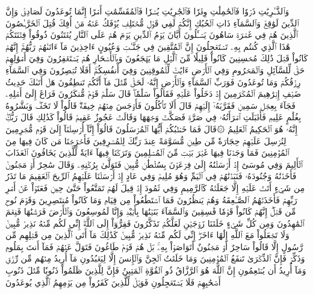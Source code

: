 وَٱلذَّـٰرِيَٰتِ ذَرۡوٗا
فَٱلۡحَٰمِلَٰتِ وِقۡرٗا
فَٱلۡجَٰرِيَٰتِ يُسۡرٗا
فَٱلۡمُقَسِّمَٰتِ أَمۡرًا
إِنَّمَا تُوعَدُونَ لَصَادِقٞ
وَإِنَّ ٱلدِّينَ لَوَٰقِعٞ
وَٱلسَّمَآءِ ذَاتِ ٱلۡحُبُكِ
إِنَّكُمۡ لَفِي قَوۡلٖ مُّخۡتَلِفٖ
يُؤۡفَكُ عَنۡهُ مَنۡ أُفِكَ
قُتِلَ ٱلۡخَرَّـٰصُونَ
ٱلَّذِينَ هُمۡ فِي غَمۡرَةٖ سَاهُونَ
يَسۡـَٔلُونَ أَيَّانَ يَوۡمُ ٱلدِّينِ
يَوۡمَ هُمۡ عَلَى ٱلنَّارِ يُفۡتَنُونَ
ذُوقُواْ فِتۡنَتَكُمۡ هَٰذَا ٱلَّذِي كُنتُم بِهِۦ تَسۡتَعۡجِلُونَ
إِنَّ ٱلۡمُتَّقِينَ فِي جَنَّـٰتٖ وَعُيُونٍ
ءَاخِذِينَ مَآ ءَاتَىٰهُمۡ رَبُّهُمۡۚ إِنَّهُمۡ كَانُواْ قَبۡلَ ذَٰلِكَ مُحۡسِنِينَ
كَانُواْ قَلِيلٗا مِّنَ ٱلَّيۡلِ مَا يَهۡجَعُونَ
وَبِٱلۡأَسۡحَارِ هُمۡ يَسۡتَغۡفِرُونَ
وَفِيٓ أَمۡوَٰلِهِمۡ حَقّٞ لِّلسَّآئِلِ وَٱلۡمَحۡرُومِ
وَفِي ٱلۡأَرۡضِ ءَايَٰتٞ لِّلۡمُوقِنِينَ
وَفِيٓ أَنفُسِكُمۡۚ أَفَلَا تُبۡصِرُونَ
وَفِي ٱلسَّمَآءِ رِزۡقُكُمۡ وَمَا تُوعَدُونَ
فَوَرَبِّ ٱلسَّمَآءِ وَٱلۡأَرۡضِ إِنَّهُۥ لَحَقّٞ مِّثۡلَ مَآ أَنَّكُمۡ تَنطِقُونَ
هَلۡ أَتَىٰكَ حَدِيثُ ضَيۡفِ إِبۡرَٰهِيمَ ٱلۡمُكۡرَمِينَ
إِذۡ دَخَلُواْ عَلَيۡهِ فَقَالُواْ سَلَٰمٗاۖ قَالَ سَلَٰمٞ قَوۡمٞ مُّنكَرُونَ
فَرَاغَ إِلَىٰٓ أَهۡلِهِۦ فَجَآءَ بِعِجۡلٖ سَمِينٖ
فَقَرَّبَهُۥٓ إِلَيۡهِمۡ قَالَ أَلَا تَأۡكُلُونَ
فَأَوۡجَسَ مِنۡهُمۡ خِيفَةٗۖ قَالُواْ لَا تَخَفۡۖ وَبَشَّرُوهُ بِغُلَٰمٍ عَلِيمٖ
فَأَقۡبَلَتِ ٱمۡرَأَتُهُۥ فِي صَرَّةٖ فَصَكَّتۡ وَجۡهَهَا وَقَالَتۡ عَجُوزٌ عَقِيمٞ
قَالُواْ كَذَٰلِكِ قَالَ رَبُّكِۖ إِنَّهُۥ هُوَ ٱلۡحَكِيمُ ٱلۡعَلِيمُ
۞قَالَ فَمَا خَطۡبُكُمۡ أَيُّهَا ٱلۡمُرۡسَلُونَ
قَالُوٓاْ إِنَّآ أُرۡسِلۡنَآ إِلَىٰ قَوۡمٖ مُّجۡرِمِينَ
لِنُرۡسِلَ عَلَيۡهِمۡ حِجَارَةٗ مِّن طِينٖ
مُّسَوَّمَةً عِندَ رَبِّكَ لِلۡمُسۡرِفِينَ
فَأَخۡرَجۡنَا مَن كَانَ فِيهَا مِنَ ٱلۡمُؤۡمِنِينَ
فَمَا وَجَدۡنَا فِيهَا غَيۡرَ بَيۡتٖ مِّنَ ٱلۡمُسۡلِمِينَ
وَتَرَكۡنَا فِيهَآ ءَايَةٗ لِّلَّذِينَ يَخَافُونَ ٱلۡعَذَابَ ٱلۡأَلِيمَ
وَفِي مُوسَىٰٓ إِذۡ أَرۡسَلۡنَٰهُ إِلَىٰ فِرۡعَوۡنَ بِسُلۡطَٰنٖ مُّبِينٖ
فَتَوَلَّىٰ بِرُكۡنِهِۦ وَقَالَ سَٰحِرٌ أَوۡ مَجۡنُونٞ
فَأَخَذۡنَٰهُ وَجُنُودَهُۥ فَنَبَذۡنَٰهُمۡ فِي ٱلۡيَمِّ وَهُوَ مُلِيمٞ
وَفِي عَادٍ إِذۡ أَرۡسَلۡنَا عَلَيۡهِمُ ٱلرِّيحَ ٱلۡعَقِيمَ
مَا تَذَرُ مِن شَيۡءٍ أَتَتۡ عَلَيۡهِ إِلَّا جَعَلَتۡهُ كَٱلرَّمِيمِ
وَفِي ثَمُودَ إِذۡ قِيلَ لَهُمۡ تَمَتَّعُواْ حَتَّىٰ حِينٖ
فَعَتَوۡاْ عَنۡ أَمۡرِ رَبِّهِمۡ فَأَخَذَتۡهُمُ ٱلصَّـٰعِقَةُ وَهُمۡ يَنظُرُونَ
فَمَا ٱسۡتَطَٰعُواْ مِن قِيَامٖ وَمَا كَانُواْ مُنتَصِرِينَ
وَقَوۡمَ نُوحٖ مِّن قَبۡلُۖ إِنَّهُمۡ كَانُواْ قَوۡمٗا فَٰسِقِينَ
وَٱلسَّمَآءَ بَنَيۡنَٰهَا بِأَيۡيْدٖ وَإِنَّا لَمُوسِعُونَ
وَٱلۡأَرۡضَ فَرَشۡنَٰهَا فَنِعۡمَ ٱلۡمَٰهِدُونَ
وَمِن كُلِّ شَيۡءٍ خَلَقۡنَا زَوۡجَيۡنِ لَعَلَّكُمۡ تَذَكَّرُونَ
فَفِرُّوٓاْ إِلَى ٱللَّهِۖ إِنِّي لَكُم مِّنۡهُ نَذِيرٞ مُّبِينٞ
وَلَا تَجۡعَلُواْ مَعَ ٱللَّهِ إِلَٰهًا ءَاخَرَۖ إِنِّي لَكُم مِّنۡهُ نَذِيرٞ مُّبِينٞ
كَذَٰلِكَ مَآ أَتَى ٱلَّذِينَ مِن قَبۡلِهِم مِّن رَّسُولٍ إِلَّا قَالُواْ سَاحِرٌ أَوۡ مَجۡنُونٌ
أَتَوَاصَوۡاْ بِهِۦۚ بَلۡ هُمۡ قَوۡمٞ طَاغُونَ
فَتَوَلَّ عَنۡهُمۡ فَمَآ أَنتَ بِمَلُومٖ
وَذَكِّرۡ فَإِنَّ ٱلذِّكۡرَىٰ تَنفَعُ ٱلۡمُؤۡمِنِينَ
وَمَا خَلَقۡتُ ٱلۡجِنَّ وَٱلۡإِنسَ إِلَّا لِيَعۡبُدُونِ
مَآ أُرِيدُ مِنۡهُم مِّن رِّزۡقٖ وَمَآ أُرِيدُ أَن يُطۡعِمُونِ
إِنَّ ٱللَّهَ هُوَ ٱلرَّزَّاقُ ذُو ٱلۡقُوَّةِ ٱلۡمَتِينُ
فَإِنَّ لِلَّذِينَ ظَلَمُواْ ذَنُوبٗا مِّثۡلَ ذَنُوبِ أَصۡحَٰبِهِمۡ فَلَا يَسۡتَعۡجِلُونِ
فَوَيۡلٞ لِّلَّذِينَ كَفَرُواْ مِن يَوۡمِهِمُ ٱلَّذِي يُوعَدُونَ